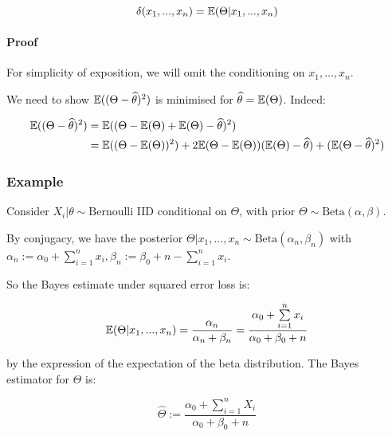 \documentclass[a4paper]{article}
\begin{document}
                \[
                    \delta(x_1, ..., x_n) = \mathbb{E}(\Theta | x_1, ..., x_n)
                \]

                \paragraph{Proof}
                    For simplicity of exposition, we will omit the conditioning
                    on $x_1, ..., x_n$.

                    We need to show $\mathbb{E}((\Theta - \widehat \theta)^2)$ is
                    minimised for $\widehat \theta = \mathbb{E}(\Theta)$. Indeed:

                    \begin{align*}
                        \mathbb{E}((\Theta - \widehat \theta)^2) & = \mathbb{E}((\Theta -
                            \mathbb{E}(\Theta) + \mathbb{E}(\Theta) - \widehat \theta)^2) \\
                        & = \mathbb{E}((\Theta - \mathbb{E}(\Theta))^2) + 2\mathbb{E}(\Theta -
                            \mathbb{E}(\Theta))(\mathbb{E}(\Theta) - \widehat \theta) +
                            (\mathbb{E}(\Theta - \widehat \theta)^2)
                    \end{align*}

            \subsubsection{Example}
                Consider $X_i | \theta \sim \text{Bernoulli}$ IID conditional on
                $\Theta$, with prior $\Theta \sim \text{Beta}(\alpha, \beta)$.

                By conjugacy, we have the posterior $\Theta | x_1, ..., x_n \sim
                \text{Beta}(\alpha_n, \beta_n)$ with $\alpha_n := \alpha_0 +
                \sum\limits_{i=1}^n x_i, \beta_n := \beta_0 + n -
                \sum\limits_{i=1}^n x_i$.

                So the Bayes estimate under squared error loss is:

                \[
                    \mathbb{E}(\Theta | x_1, ..., x_n) = \frac{\alpha_n}{\alpha_n +
                    \beta_n} = \frac{\alpha_0 + \sum\limits_{i=1}^n x_i}
                    {\alpha_0 + \beta_0 + n}
                \]

                by the expression of the expectation of the beta distribution.
                The Bayes estimator for $\Theta$ is:

                \[
                    \widehat \Theta := \frac{\alpha_0 + \sum\limits_{i=1}^n X_i}
                    {\alpha_0 + \beta_0 + n}
                \]
\end{document}
